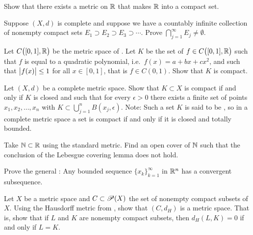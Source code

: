\begin{exercise}[Challenging]
Show that there exists a metric on ${\mathbb{R}}$ that makes ${\mathbb{R}}$ into a compact set.
\end{exercise}

\begin{exercise}
Suppose $(X,d)$ is complete and suppose we have a countably infinite
collection of nonempty compact sets $E_1 \supset E_2 \supset E_3 \supset
\cdots$.  Prove $\bigcap_{j=1}^\infty E_j \neq \emptyset$.
\end{exercise}

\begin{exercise}[Challenging]
Let $C\bigl([0,1],{\mathbb{R}}\bigr)$ be the metric space of .
Let $K$ be the set of $f \in C\bigl([0,1],{\mathbb{R}}\bigr)$ such that
$f$ is equal to a quadratic polynomial, i.e.\ $f(x) = a+bx+cx^2$, and such that
$\bigl\lvert {f(x)} \bigr\rvert \leq 1$ for all $x \in [0,1]$,
that is $f \in C(0,1)$.  Show that $K$ is compact.
\end{exercise}

\begin{exercise}[Challenging] \label{exercise:mstotbound}
Let $(X,d)$ be a complete metric space.
Show that $K \subset X$ is compact if and only if $K$ is closed
and such that for every $\epsilon > 0$
there exists a finite set of points $x_1,x_2,\ldots,x_n$ with
$K \subset \bigcup_{j=1}^n B(x_j,\epsilon)$.
Note: Such a set $K$ is said to be \emph{},
so in a complete metric space a set is compact if and only
if it is closed and totally bounded.
\end{exercise}

\begin{exercise}
Take ${\mathbb{N}} \subset {\mathbb{R}}$ using the standard metric.  Find an open cover of ${\mathbb{N}}$
such that the conclusion of the Lebesgue covering lemma does not hold.
\end{exercise}

\begin{exercise}
Prove the general :
Any bounded sequence $\{ x_k \}_{k=1}^\infty$ in ${\mathbb{R}}^n$
has a convergent subsequence.
\end{exercise}

\begin{exercise}
Let $X$ be a metric space and
$C \subset {\mathscr{P}}(X)$ the set of nonempty compact subsets of $X$.
Using the Hausdorff metric from ,
show that $(C,d_H)$ is a metric space.  That is, show that
if $L$ and $K$ are nonempty compact subsets, then $d_H(L,K) = 0$
if and only if $L=K$.
\end{exercise}


